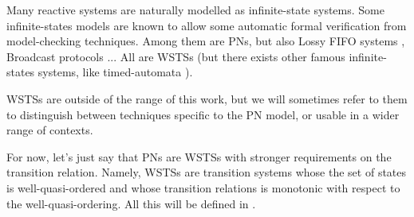 
Many reactive systems are naturally modelled as infinite-state systems.
Some infinite-states models are known to allow some automatic formal verification from model-checking techniques.
Among them are \acp{PN}, but also Lossy FIFO systems \citep{Abdulla98}, Broadcast protocols \citep{Emerson98}...
All are \acp{WSTS} (but there exists other famous infinite-states systems, like timed-automata \citep{Alur94}).

\acp{WSTS} are outside of the range of this work, but we will sometimes refer to them to distinguish between techniques specific to the \ac{PN} model, or usable in a wider range of contexts.

For now, let's just say that \acp{PN} are \acp{WSTS} with stronger requirements on the transition relation.
Namely, \acp{WSTS} are transition systems whose the set of states is well-quasi-ordered and whose transition relations is monotonic with respect to the well-quasi-ordering.
All this will be defined in .

